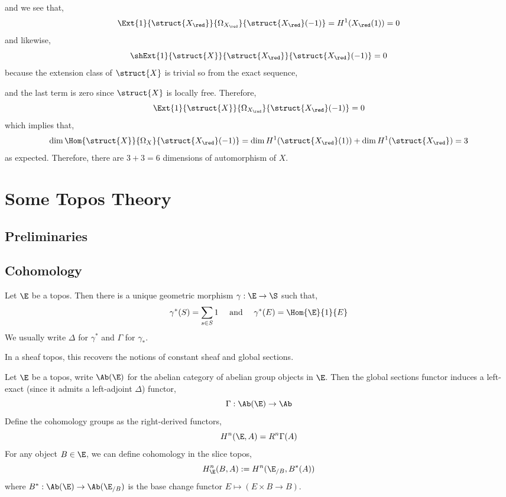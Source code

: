 \documentclass[12pt]{article}
\begin{document}
\begin{rmk}
and we see that,
\[ \Ext{1}{\struct{X_{\red}}}{\Omega_{X_{\red}}}{\struct{X_{\red}}(-1)} = H^1(X_{\red}(1)) = 0 \]
and likewise,
\[ \shExt{1}{\struct{X}}{\struct{X_{\red}}}{\struct{X_{\red}}(-1)} = 0 \]
because the extension class of $\struct{X}$ is trivial so from the exact sequence,
\begin{center}
\end{center}
and the last term is zero since $\struct{X}$ is locally free. Therefore, 
\[ \Ext{1}{\struct{X}}{\Omega_{X_{\red}}}{\struct{X_{\red}}(-1)} = 0 \]
which implies that,
\[ \dim \Hom{\struct{X}}{\Omega_X}{\struct{X_{\red}}(-1)} = \dim{H^1(\struct{X_{\red}}(1))} + \dim{H^1(\struct{X_{\red}})} = 3 \]
as expected. Therefore, there are $3 + 3 = 6$ dimensions of automorphism of $X$. 
\end{rmk}

\section{Some Topos Theory}

\subsection{Preliminaries}

\subsection{Cohomology}

\begin{defn}
Let $\E$ be a topos. Then there is a unique geometric morphism $\gamma : \E \to \S$ such that,
\[ \gamma^*(S) = \sum_{s \in S} 1 \quad \text{ and } \quad \gamma^*(E) = \Hom{\E}{1}{E} \]
We usually write $\Delta$ for $\gamma^*$ and $\Gamma$ for $\gamma_*$.
\end{defn}

\begin{rmk}
In a sheaf topos, this recovers the notions of constant sheaf and global sections.
\end{rmk}

\begin{defn}
Let $\E$ be a topos, write $\Ab(\E)$ for the abelian category of abelian group objects in $\E$. Then the global sections functor induces a left-exact (since it admits a left-adjoint $\Delta$) functor,
\[ \Gamma : \Ab(\E) \to \Ab \]
Define the cohomology groups as the right-derived functors,
\[ H^n(\E, A) = R^n \Gamma(A) \]
For any object $B \in \E$, we can define cohomology in the slice topos,
\[ H^n_{\E}(B, A) := H^n(\E_{/B}, B^*(A)) \]
where $B^* : \Ab(\E) \to \Ab(\E_{/B})$ is the base change functor $E \mapsto (E \times B \to B)$. 
\end{defn}
\end{document}
